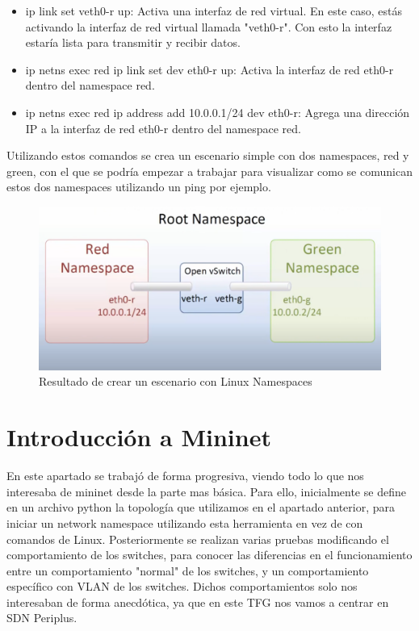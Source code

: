 \documentclass[a4paper, 12pt]{book}
\begin{document}
\begin{itemize}
		\item ip link set veth0-r up: Activa una interfaz de red virtual. En este caso, estás activando la interfaz de red virtual llamada "veth0-r". Con esto la interfaz estaría lista para transmitir y recibir datos. 
		
		\item ip netns exec red ip link set dev eth0-r up: Activa la interfaz de red eth0-r dentro del namespace red.
		
		\item ip netns exec red ip address add 10.0.0.1/24 dev eth0-r: Agrega una dirección IP a la interfaz de red eth0-r dentro del namespace red.
		
		
		
		
		
		
	
	\end{itemize}
	
	Utilizando estos comandos se crea un escenario simple con dos namespaces, red y green, con el que se podría empezar a trabajar para visualizar como se comunican estos dos namespaces utilizando un ping por ejemplo.
	
	\begin{figure}[H]
		\centering
		\includegraphics[width=14cm, keepaspectratio]{img/Linux namespaces}
		\caption{Resultado de crear un escenario con Linux Namespaces}
		\label{figura:linux_namespaces}
	\end{figure}
	
	
	\section{Introducción a Mininet}
	
	En este apartado se trabajó de forma progresiva, viendo todo lo que nos interesaba de mininet desde la parte mas básica.
	Para ello, inicialmente se define en un archivo python la topología que utilizamos en el apartado anterior, para iniciar un network namespace utilizando esta herramienta en vez de con comandos de Linux.
	Posteriormente se realizan varias pruebas modificando el comportamiento de los switches, para conocer las diferencias en el funcionamiento entre un comportamiento "normal" de los switches, y un comportamiento específico con VLAN de los switches.
	Dichos comportamientos solo nos interesaban de forma anecdótica, ya que en este TFG nos vamos a centrar en SDN Periplus.
	
\end{document}
